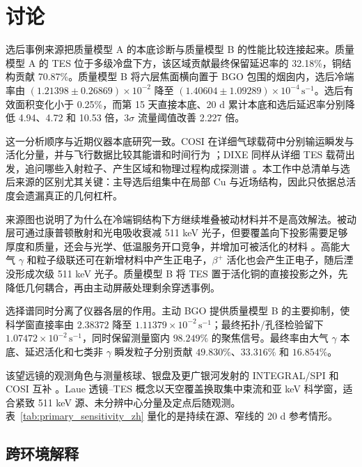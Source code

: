 \documentclass[11pt]{article}
\newcommand{\revblue}[1]{\textcolor{revisionblue}{#1}}
\newcommand{\cps}{\,\mathrm{s^{-1}}}
\begin{document}
\FloatBarrier

\section{讨论}
\label{sec:discussion}

选后事例来源把质量模型 A 的本底诊断与质量模型 B 的性能比较连接起来。质量模型 A 的 TES 位于多级冷盘下方，该区域贡献最终保留延迟率的 32.18\%，铜结构贡献 70.87\%。质量模型 B 将六层焦面横向置于 BGO 包围的烟囱内，选后冷端率由 $(1.21398\pm0.26869)\times10^{-2}$ 降至 $(1.40604\pm1.09289)\times10^{-4}\cps$。选后有效面积变化小于 0.25\%，而第 15 天直接本底、20 d 累计本底和选后延迟率分别降低 4.94、4.72 和 10.53 倍，$3\sigma$ 流量阈值改善 2.227 倍。

这一分析顺序与近期仪器本底研究一致。COSI 在详细气球载荷中分别输运瞬发与活化分量，并与飞行数据比较其能谱和时间行为 \cite{Gallego2025Balloon}；DIXE 同样从详细 TES 载荷出发，追问哪些入射粒子、产生区域和物理过程构成探测谱 \cite{Tian2026DIXE}。本工作中总清单与选后来源的区别尤其关键：主导选后组集中在局部 Cu 与近场结构，因此只依据总活度会遗漏真正的几何杠杆。

来源图也说明了为什么在冷端铜结构下方继续堆叠被动材料并不是高效解法。被动层可通过康普顿散射和光电吸收衰减 511 keV 光子，但要覆盖向下投影需要足够厚度和质量，还会与光学、低温服务开口竞争，并增加可被活化的材料 \cite{NISTXCOM}。\revblue{高能大气 $\gamma$ 和粒子级联}还可在新增材料中产生正电子，$\beta^+$ 活化也会产生正电子，随后湮没形成次级 511 keV 光子。质量模型 B 将 TES 置于活化铜的直接投影之外，先降低几何耦合，再由主动屏蔽处理剩余穿透事例。

选择谱同时分离了仪器各层的作用。主动 BGO 提供质量模型 B 的主要抑制，使科学窗直接率由 $2.38372$ 降至 $1.11379\times10^{-2}\cps$；最终拓扑/孔径检验留下 $1.07472\times10^{-2}\cps$，同时保留测量窗内 $98.249\%$ 的聚焦信号。最终率由\revblue{大气 $\gamma$ 本底}、延迟活化和\revblue{七类非 $\gamma$ 瞬发粒子}分别贡献 $49.830\%$、$33.316\%$ 和 $16.854\%$。

该望远镜的观测角色与测量核球、银盘及更广银河发射的 INTEGRAL/SPI 和 COSI 互补 \cite{Siegert2016AA,Kierans2020,Siegert2020COSI,Yoneda2025,Karwin2023}。Laue 透镜--TES 概念以天空覆盖换取集中束流和亚 keV 科学窗，适合紧致 511 keV 源、未分辨中心分量及定点后随观测。表~\ref{tab:primary_sensitivity_zh} 量化的是持续在源、窄线的 20 d 参考情形。

\subsection{跨环境解释}
\end{document}
